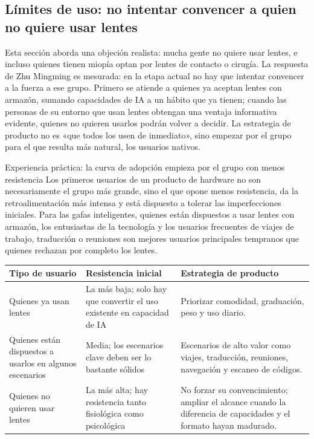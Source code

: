 \documentclass[a4paper]{article}
\begin{document}
\subsection{Límites de uso: no intentar convencer a quien no quiere usar lentes}

Esta sección aborda una objeción realista: mucha gente no quiere usar lentes, e incluso quienes tienen miopía optan por lentes de contacto o cirugía. La respuesta de Zhu Mingming es mesurada: en la etapa actual no hay que intentar convencer a la fuerza a ese grupo. Primero se atiende a quienes ya aceptan lentes con armazón, sumando capacidades de IA a un hábito que ya tienen; cuando las personas de su entorno que usan lentes obtengan una ventaja informativa evidente, quienes no quieren usarlos podrán volver a decidir. La estrategia de producto no es «que todos los usen de inmediato», sino empezar por el grupo para el que resulta más natural, los usuarios nativos.

\begin{knowledgebox}{Experiencia práctica: la curva de adopción empieza por el grupo con menos resistencia}
Los primeros usuarios de un producto de hardware no son necesariamente el grupo más grande, sino el que opone menos resistencia, da la retroalimentación más intensa y está dispuesto a tolerar las imperfecciones iniciales. Para las gafas inteligentes, quienes están dispuestos a usar lentes con armazón, los entusiastas de la tecnología y los usuarios frecuentes de viajes de trabajo, traducción o reuniones son mejores usuarios principales tempranos que quienes rechazan por completo los lentes.
\end{knowledgebox}

\noindent\begin{tabularx}{\textwidth}{p{}p{}X}
\toprule
Tipo de usuario & Resistencia inicial & Estrategia de producto \\
\midrule
Quienes ya usan lentes & La más baja; solo hay que convertir el uso existente en capacidad de IA & Priorizar comodidad, graduación, peso y uso diario. \\
Quienes están dispuestos a usarlos en algunos escenarios & Media; los escenarios clave deben ser lo bastante sólidos & Escenarios de alto valor como viajes, traducción, reuniones, navegación y escaneo de códigos. \\
Quienes no quieren usar lentes & La más alta; hay resistencia tanto fisiológica como psicológica & No forzar su convencimiento; ampliar el alcance cuando la diferencia de capacidades y el formato hayan madurado. \\
\bottomrule
\end{tabularx}
\end{document}
